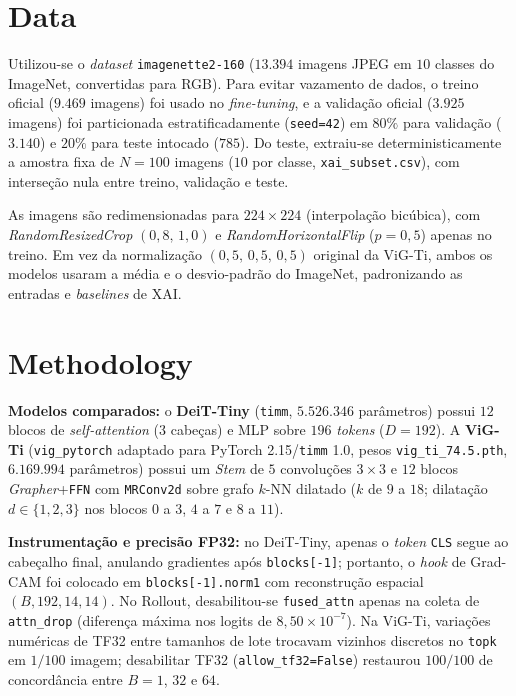 \documentclass{article}
\begin{document}
\section{Data}
\label{sec:data}

Utilizou-se o \textit{dataset} \texttt{imagenette2-160} ($13.394$ imagens JPEG em $10$ classes do ImageNet, convertidas para RGB). Para evitar vazamento de dados, o treino oficial ($9.469$ imagens) foi usado no \textit{fine-tuning}, e a validação oficial ($3.925$ imagens) foi particionada estratificadamente (\texttt{seed=42}) em $80\%$ para validação ($3.140$) e $20\%$ para teste intocado ($785$). Do teste, extraiu-se deterministicamente a amostra fixa de $N = 100$ imagens ($10$ por classe, \texttt{xai\_subset.csv}), com interseção nula entre treino, validação e teste.

As imagens são redimensionadas para $224 \times 224$ (interpolação bicúbica), com \textit{RandomResizedCrop} $(0{,}8,\,1{,}0)$ e \textit{RandomHorizontalFlip} ($p = 0{,}5$) apenas no treino. Em vez da normalização $(0{,}5,\,0{,}5,\,0{,}5)$ original da ViG-Ti, ambos os modelos usaram a média e o desvio-padrão do ImageNet, padronizando as entradas e \textit{baselines} de XAI.

\section{Methodology}
\label{sec:method}

\textbf{Modelos comparados:} o \textbf{DeiT-Tiny} (\texttt{timm}, $5.526.346$ parâmetros) possui $12$ blocos de \textit{self-attention} ($3$ cabeças) e MLP sobre $196$ \textit{tokens} ($D = 192$). A \textbf{ViG-Ti} (\texttt{vig\_pytorch} adaptado para PyTorch 2.15/\texttt{timm} 1.0, pesos \texttt{vig\_ti\_74.5.pth}, $6.169.994$ parâmetros) possui um \textit{Stem} de $5$ convoluções $3 \times 3$ e $12$ blocos \textit{Grapher}+\texttt{FFN} com \texttt{MRConv2d} sobre grafo $k$-NN dilatado ($k$ de $9$ a $18$; dilatação $d \in \{1, 2, 3\}$ nos blocos $0$ a $3$, $4$ a $7$ e $8$ a $11$).

\textbf{Instrumentação e precisão FP32:} no DeiT-Tiny, apenas o \textit{token} \texttt{CLS} segue ao cabeçalho final, anulando gradientes após \texttt{blocks[-1]}; portanto, o \textit{hook} de Grad-CAM foi colocado em \texttt{blocks[-1].norm1} com reconstrução espacial $(B, 192, 14, 14)$. No Rollout, desabilitou-se \texttt{fused\_attn} apenas na coleta de \texttt{attn\_drop} (diferença máxima nos logits de $8{,}50 \times 10^{-7}$). Na ViG-Ti, variações numéricas de TF32 entre tamanhos de lote trocavam vizinhos discretos no \texttt{topk} em $1/100$ imagem; desabilitar TF32 (\texttt{allow\_tf32=False}) restaurou $100/100$ de concordância entre $B = 1$, $32$ e $64$.
\end{document}

